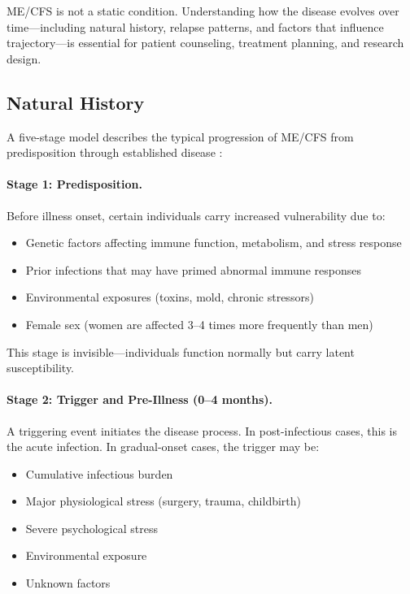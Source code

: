 
ME/CFS is not a static condition. Understanding how the disease evolves over time---including natural history, relapse patterns, and factors that influence trajectory---is essential for patient counseling, treatment planning, and research design.

\subsection{Natural History}

A five-stage model describes the typical progression of ME/CFS from predisposition through established disease \cite{Maksoud2020natural}:

\paragraph{Stage 1: Predisposition.}
Before illness onset, certain individuals carry increased vulnerability due to:
\begin{itemize}
    \item Genetic factors affecting immune function, metabolism, and stress response
    \item Prior infections that may have primed abnormal immune responses
    \item Environmental exposures (toxins, mold, chronic stressors)
    \item Female sex (women are affected 3--4 times more frequently than men)
\end{itemize}

This stage is invisible---individuals function normally but carry latent susceptibility.

\paragraph{Stage 2: Trigger and Pre-Illness (0--4 months).}
A triggering event initiates the disease process. In post-infectious cases, this is the acute infection. In gradual-onset cases, the trigger may be:
\begin{itemize}
    \item Cumulative infectious burden
    \item Major physiological stress (surgery, trauma, childbirth)
    \item Severe psychological stress
    \item Environmental exposure
    \item Unknown factors
\end{itemize}

